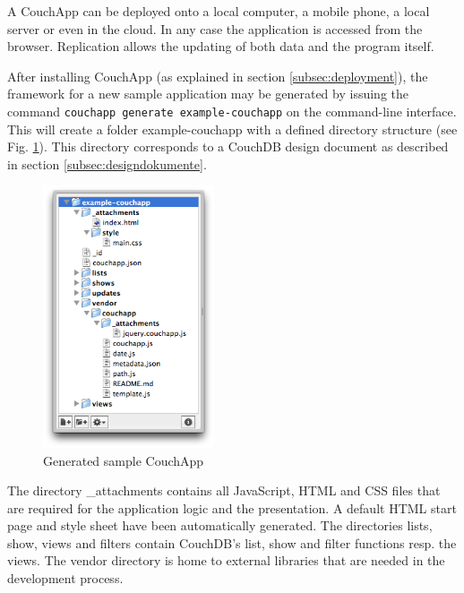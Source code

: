A CouchApp can be deployed onto a local computer, a mobile phone, a local server or even in the cloud. In any case the application is accessed from the browser. Replication allows the updating of both data and the program itself.

After installing CouchApp (as explained in section \ref{subsec:deployment}), the framework for a new sample application may be generated by issuing the command \lstinline!couchapp generate example-couchapp! on the command-line interface. This will create a folder {\selectfont example-couchapp} with a defined directory structure (see Fig. \ref{fig:example-couchapp}). This directory corresponds to a CouchDB design document as described in section \ref{subsec:designdokumente}.

\medskip
\begin{figure}[ht] 
 \begin{center}
   \includegraphics[width=0.45\textwidth]{grafik/example-couchapp} 
 \end{center}
 \caption{Generated sample CouchApp}
 \label{fig:example-couchapp} 
\end{figure}

The directory {\selectfont \_attachments} contains all JavaScript, HTML and CSS files that are required for the application logic and the presentation. A default HTML start page and style sheet have been automatically generated. The directories {\selectfont lists}, {\selectfont show}, {\selectfont views} and {\selectfont filters} contain CouchDB's list, show and filter functions resp. the views. The {\selectfont vendor} directory is home to external libraries that are needed in the development process.

